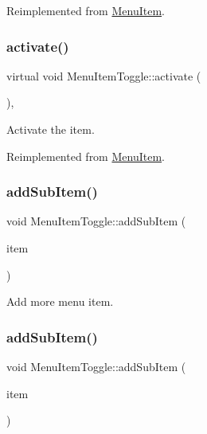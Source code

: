 Reimplemented from \hyperlink{classMenuItem_a2c5e2d7641bbf1dc9da877557c6c5e92}{Menu\+Item}.

\mbox{\label{classMenuItemToggle_a39fc9a7827cfe809858f39f6bce8a3e7}} 
\subsubsection{\texorpdfstring{activate()}{activate()}\hspace{0.1cm}{\footnotesize\ttfamily [2/2]}}
{\footnotesize\ttfamily virtual void Menu\+Item\+Toggle\+::activate (\begin{DoxyParamCaption}{ }\end{DoxyParamCaption})\hspace{0.3cm}{\ttfamily [override]}, {\ttfamily [virtual]}}

Activate the item. 

Reimplemented from \hyperlink{classMenuItem_a2c5e2d7641bbf1dc9da877557c6c5e92}{Menu\+Item}.

\mbox{\label{classMenuItemToggle_a6aa25743d0b1e4ad143dbde655c65fdb}} 
\subsubsection{\texorpdfstring{add\+Sub\+Item()}{addSubItem()}\hspace{0.1cm}{\footnotesize\ttfamily [1/2]}}
{\footnotesize\ttfamily void Menu\+Item\+Toggle\+::add\+Sub\+Item (\begin{DoxyParamCaption}\item[{\hyperlink{classMenuItem}{Menu\+Item} $\ast$}]{item }\end{DoxyParamCaption})}

Add more menu item. \mbox{\label{classMenuItemToggle_a6aa25743d0b1e4ad143dbde655c65fdb}} 
\subsubsection{\texorpdfstring{add\+Sub\+Item()}{addSubItem()}\hspace{0.1cm}{\footnotesize\ttfamily [2/2]}}
{\footnotesize\ttfamily void Menu\+Item\+Toggle\+::add\+Sub\+Item (\begin{DoxyParamCaption}\item[{\hyperlink{classMenuItem}{Menu\+Item} $\ast$}]{item }\end{DoxyParamCaption})}

